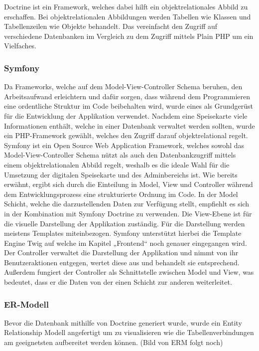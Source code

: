     Doctrine ist ein Framework, welches dabei hilft ein objektrelationales Abbild zu erschaffen. Bei objektrelationalen Abbildungen werden Tabellen wie Klassen und Tabellenzeilen wie Objekte behandelt. Das vereinfacht den Zugriff auf verschiedene Datenbanken im Vergleich zu dem Zugriff mittels Plain PHP um ein Vielfaches. 
    
    \subsubsection{Symfony}

Da Frameworks, welche auf dem Model-View-Controller Schema beruhen, den Arbeitsaufwand erleichtern und dafür sorgen, dass während dem Programmieren eine ordentliche Struktur im Code beibehalten wird, wurde eines als Grundgerüst für die Entwicklung der Applikation verwendet. Nachdem eine Speisekarte viele Informationen enthält, welche in einer Datenbank verwaltet werden sollten, wurde ein PHP-Framework gewählt, welches den Zugriff darauf objektrelational regelt.
Symfony ist ein Open Source Web Application Framework, welches sowohl das Model-View-Controller Schema nützt als auch den Datenbankzugriff mittels einem objektrelationalen Abbild regelt, weshalb es die ideale Wahl für die Umsetzung der digitalen Speisekarte und des Adminbereichs ist. Wie bereits erwähnt, ergibt sich durch die Einteilung in Model, View und Controller während dem Entwicklungsprozess eine strukturierte Ordnung im Code. In der Model Schicht, welche die darzustellenden Daten zur Verfügung stellt, empfiehlt es sich in der Kombination mit Symfony Doctrine zu verwenden. Die View-Ebene ist für die visuelle Darstellung der Applikation zuständig. Für die  Darstellung werden meistens Templates miteinbezogen. Symfony unterstützt hierbei die Template Engine Twig auf welche im Kapitel „Frontend“ noch genauer eingegangen wird.
Der Controller verwaltet die Darstellung der Applikation und nimmt von ihr Benutzeraktionen entgegen, wertet diese aus und behandelt sie entsprechend. Außerdem fungiert der Controller als Schnittstelle zwischen Model und View, was bedeutet, dass er die Daten von der einen Schicht zur anderen weiterleitet.
    

    \subsubsection{ER-Modell}

Bevor die Datenbank mithilfe von Doctrine generiert wurde, wurde ein Entity Relationship Modell angefertigt um zu visualisieren wie die Tabellenverbindungen am geeignetsten aufbereitet werden können.  
(Bild von ERM folgt noch) 
 
